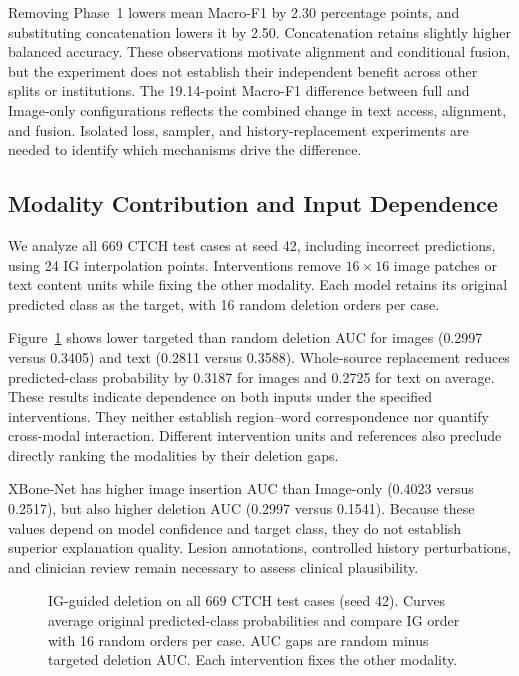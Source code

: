 \documentclass[conference,a4paper]{IEEEtran}
\begin{document}


Removing Phase~1 lowers mean Macro-F1 by 2.30 percentage points, and substituting concatenation lowers it by 2.50. Concatenation retains slightly higher balanced accuracy. These observations motivate alignment and conditional fusion, but the experiment does not establish their independent benefit across other splits or institutions. The 19.14-point Macro-F1 difference between full and Image-only configurations reflects the combined change in text access, alignment, and fusion. Isolated loss, sampler, and history-replacement experiments are needed to identify which mechanisms drive the difference.

\subsection{Modality Contribution and Input Dependence}
We analyze all 669 CTCH test cases at seed 42, including incorrect predictions, using 24 IG interpolation points. Interventions remove $16\times16$ image patches or text content units while fixing the other modality. Each model retains its original predicted class as the target, with 16 random deletion orders per case.

Figure~\ref{fig:ig} shows lower targeted than random deletion AUC for images (0.2997 versus 0.3405) and text (0.2811 versus 0.3588). Whole-source replacement reduces predicted-class probability by 0.3187 for images and 0.2725 for text on average. These results indicate dependence on both inputs under the specified interventions. They neither establish region--word correspondence nor quantify cross-modal interaction. Different intervention units and references also preclude directly ranking the modalities by their deletion gaps.

XBone-Net has higher image insertion AUC than Image-only (0.4023 versus 0.2517), but also higher deletion AUC (0.2997 versus 0.1541). Because these values depend on model confidence and target class, they do not establish superior explanation quality. Lesion annotations, controlled history perturbations, and clinician review remain necessary to assess clinical plausibility.

\begin{figure}[t]
\centering

\caption{IG-guided deletion on all 669 CTCH test cases (seed 42). Curves average original predicted-class probabilities and compare IG order with 16 random orders per case. AUC gaps are random minus targeted deletion AUC. Each intervention fixes the other modality.}
\label{fig:ig}
\end{figure}
\end{document}
